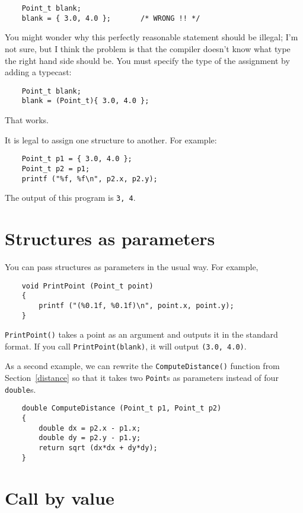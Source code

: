 \begin{verbatim}
	Point_t blank;
	blank = { 3.0, 4.0 };       /* WRONG !! */
\end{verbatim}
%
You might wonder why this perfectly reasonable statement should
be illegal; I'm not sure, but I think the problem is that the compiler
doesn't know what type the right hand side should be.  You must specify
the type of the assignment by adding a typecast:

\begin{verbatim}
	Point_t blank;
	blank = (Point_t){ 3.0, 4.0 };
\end{verbatim}
%
That works.

It is legal to assign one structure to
another.  For example:

\begin{verbatim}
	Point_t p1 = { 3.0, 4.0 };
	Point_t p2 = p1;
	printf ("%f, %f\n", p2.x, p2.y);
\end{verbatim}
%
The output of this program is {\tt 3, 4}.

\section{Structures as parameters}
\label{Structures as parameters}

You can pass structures as parameters in the usual way.  For
example,

\begin{verbatim}
	void PrintPoint (Point_t point) 
	{
		printf ("(%0.1f, %0.1f)\n", point.x, point.y);
	}
\end{verbatim}
%
{\tt PrintPoint()} takes a point as an argument and outputs it in
the standard format.  If you call {\tt PrintPoint(blank)},
it will output {\tt (3.0, 4.0)}.

As a second example, we can rewrite the {\tt ComputeDistance()} function from
Section~\ref{distance} so that it takes two {\tt Point}s as parameters
instead of four {\tt double}s.

\begin{verbatim}
	double ComputeDistance (Point_t p1, Point_t p2) 
	{
		double dx = p2.x - p1.x;
		double dy = p2.y - p1.y;
		return sqrt (dx*dx + dy*dy);
	}
\end{verbatim}

\section{Call by value}
\label{Call by value}

